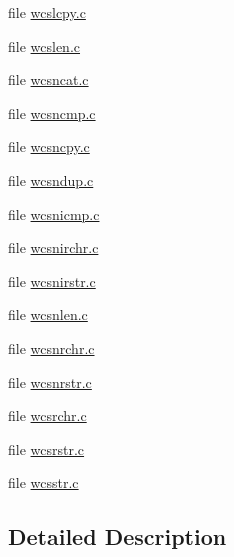 \begin{DoxyCompactItemize}
file \hyperlink{wcslcpy_8c}{wcslcpy.\-c}
\item 
file \hyperlink{wcslen_8c}{wcslen.\-c}
\item 
file \hyperlink{wcsncat_8c}{wcsncat.\-c}
\item 
file \hyperlink{wcsncmp_8c}{wcsncmp.\-c}
\item 
file \hyperlink{wcsncpy_8c}{wcsncpy.\-c}
\item 
file \hyperlink{wcsndup_8c}{wcsndup.\-c}
\item 
file \hyperlink{wcsnicmp_8c}{wcsnicmp.\-c}
\item 
file \hyperlink{wcsnirchr_8c}{wcsnirchr.\-c}
\item 
file \hyperlink{wcsnirstr_8c}{wcsnirstr.\-c}
\item 
file \hyperlink{wcsnlen_8c}{wcsnlen.\-c}
\item 
file \hyperlink{wcsnrchr_8c}{wcsnrchr.\-c}
\item 
file \hyperlink{wcsnrstr_8c}{wcsnrstr.\-c}
\item 
file \hyperlink{wcsrchr_8c}{wcsrchr.\-c}
\item 
file \hyperlink{wcsrstr_8c}{wcsrstr.\-c}
\item 
file \hyperlink{wcsstr_8c}{wcsstr.\-c}
\end{DoxyCompactItemize}


\subsection{Detailed Description}
